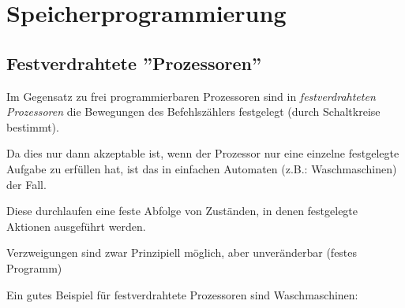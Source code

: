 \documentclass[12pt]{report}
\begin{document}
\section{Speicherprogrammierung}
\subsection{Festverdrahtete ''Prozessoren''}
\begin{defbox}
  Im Gegensatz zu frei programmierbaren Prozessoren sind in \textit{festverdrahteten Prozessoren} die Bewegungen
  des Befehlszählers festgelegt (durch Schaltkreise bestimmt).
  
  Da dies nur dann akzeptable ist, wenn der Prozessor nur eine einzelne festgelegte Aufgabe zu erfüllen hat, ist das 
  in einfachen Automaten (z.B.: Waschmaschinen) der Fall.
  
  Diese durchlaufen eine feste Abfolge von Zuständen, in denen festgelegte Aktionen ausgeführt werden.
  
  Verzweigungen sind zwar Prinzipiell möglich, aber unveränderbar (festes Programm)
\end{defbox}
Ein gutes Beispiel für festverdrahtete Prozessoren sind Waschmaschinen:
\end{document}
